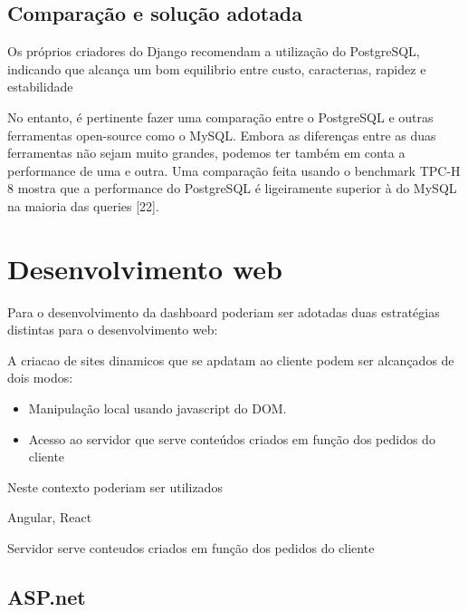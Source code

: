 \subsection{Comparação e solução adotada}


Os próprios criadores do Django recomendam a utilização do PostgreSQL, indicando que alcança um bom equilibrio entre custo, caracterıas, rapidez e estabilidade




No entanto, é pertinente fazer uma comparação entre o PostgreSQL e
outras ferramentas open-source como o MySQL. Embora as diferenças entre
as duas ferramentas não sejam muito grandes, podemos ter também em conta
a performance de uma e outra. Uma comparação feita usando o benchmark
TPC-H 8 mostra que a performance do PostgreSQL é ligeiramente superior à
do MySQL na maioria das queries [22].



\newpage
\section{Desenvolvimento web}



Para o desenvolvimento da dashboard poderiam ser adotadas duas estratégias distintas para o desenvolvimento web: 


A criacao de sites dinamicos que se apdatam ao cliente podem ser alcançados de dois modos: 

\begin{itemize}
	\item Manipulação local usando javascript do DOM. 
	
	\item Acesso ao servidor que serve conteúdos criados em função dos pedidos do cliente
	
\end{itemize}



Neste contexto poderiam ser utilizados 


Angular, React

Servidor serve conteudos criados em função dos pedidos do cliente 







\subsection{ASP.net}

